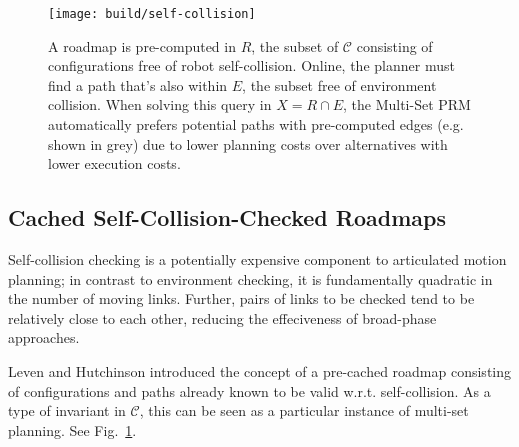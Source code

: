 \begin{figure}
\centering
\texttt{[image: build/self-collision]}
\caption{A roadmap is pre-computed in $R$,
  the subset of $\mathcal{C}$ consisting of configurations free
  of robot self-collision.
  Online, the planner must find a path that's also within $E$,
  the subset free of environment collision.
  When solving this query in $X = R \cap E$,
  the Multi-Set PRM automatically prefers potential paths with
  pre-computed edges (e.g. shown in grey)
  due to lower planning costs over alternatives with lower
  execution costs.}
\label{fig:self-collision-example}
\end{figure}

\subsection{Cached Self-Collision-Checked Roadmaps}
\label{subsec:cached-self-valid}

Self-collision checking is a potentially expensive component to
articulated motion planning;
in contrast to environment checking,
it is fundamentally quadratic in the number of moving links.
Further, pairs of links to be checked
tend to be relatively close to each other,
reducing the effeciveness of broad-phase approaches.

Leven and Hutchinson \cite{leven2000changing}
introduced the concept of a pre-cached roadmap consisting of
configurations and paths already known to be valid w.r.t.
self-collision.
As a type of invariant in $\mathcal{C}$,
this can be seen as a particular instance of multi-set planning.
See Fig.~\ref{fig:self-collision-example}.


